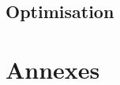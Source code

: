 \documentclass[a4paper,11pt,pdf]{pacmanreport}
\begin{document}





\subsection{Optimisation}





%


\newpage




\newpage

\appendix
\section{Annexes}

\end{document}
